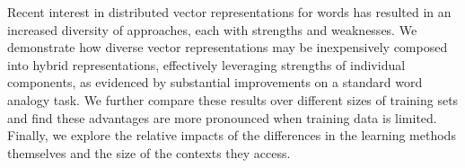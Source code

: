 Recent interest in distributed vector representations for words has resulted in an increased diversity of approaches, each with strengths and weaknesses. We demonstrate how diverse vector representations may be inexpensively composed into hybrid representations, effectively leveraging strengths of individual components, as evidenced by substantial improvements on a standard word analogy task. We further compare these results over different sizes of training sets and find these advantages are more pronounced when training data is limited. Finally, we explore the relative impacts of the differences in the learning methods themselves and the size of the contexts they access.
